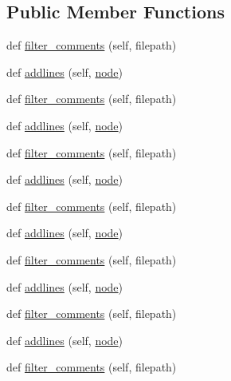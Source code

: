 \subsection*{Public Member Functions}
\begin{DoxyCompactItemize}
\item 
def \hyperlink{classwaflib_1_1_tools_1_1winres_1_1rc__parser_af948ecfd6555b3bf5134319a34f469a4}{filter\+\_\+comments} (self, filepath)
\item 
def \hyperlink{classwaflib_1_1_tools_1_1winres_1_1rc__parser_ad526be39acab6315dcb188e48d9d506e}{addlines} (self, \hyperlink{structnode}{node})
\item 
def \hyperlink{classwaflib_1_1_tools_1_1winres_1_1rc__parser_af948ecfd6555b3bf5134319a34f469a4}{filter\+\_\+comments} (self, filepath)
\item 
def \hyperlink{classwaflib_1_1_tools_1_1winres_1_1rc__parser_ad526be39acab6315dcb188e48d9d506e}{addlines} (self, \hyperlink{structnode}{node})
\item 
def \hyperlink{classwaflib_1_1_tools_1_1winres_1_1rc__parser_af948ecfd6555b3bf5134319a34f469a4}{filter\+\_\+comments} (self, filepath)
\item 
def \hyperlink{classwaflib_1_1_tools_1_1winres_1_1rc__parser_ad526be39acab6315dcb188e48d9d506e}{addlines} (self, \hyperlink{structnode}{node})
\item 
def \hyperlink{classwaflib_1_1_tools_1_1winres_1_1rc__parser_af948ecfd6555b3bf5134319a34f469a4}{filter\+\_\+comments} (self, filepath)
\item 
def \hyperlink{classwaflib_1_1_tools_1_1winres_1_1rc__parser_ad526be39acab6315dcb188e48d9d506e}{addlines} (self, \hyperlink{structnode}{node})
\item 
def \hyperlink{classwaflib_1_1_tools_1_1winres_1_1rc__parser_af948ecfd6555b3bf5134319a34f469a4}{filter\+\_\+comments} (self, filepath)
\item 
def \hyperlink{classwaflib_1_1_tools_1_1winres_1_1rc__parser_ad526be39acab6315dcb188e48d9d506e}{addlines} (self, \hyperlink{structnode}{node})
\item 
def \hyperlink{classwaflib_1_1_tools_1_1winres_1_1rc__parser_af948ecfd6555b3bf5134319a34f469a4}{filter\+\_\+comments} (self, filepath)
\item 
def \hyperlink{classwaflib_1_1_tools_1_1winres_1_1rc__parser_ad526be39acab6315dcb188e48d9d506e}{addlines} (self, \hyperlink{structnode}{node})
\item 
def \hyperlink{classwaflib_1_1_tools_1_1winres_1_1rc__parser_af948ecfd6555b3bf5134319a34f469a4}{filter\+\_\+comments} (self, filepath)

\end{DoxyCompactItemize}
